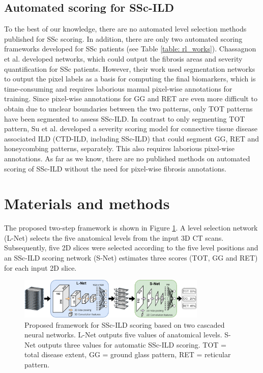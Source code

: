 \subsection{Automated scoring for SSc-ILD}
To the best of our knowledge, there are no automated level selection methods published for SSc scoring. In addition, there are only two automated scoring frameworks developed for SSc patients (see Table \ref{table: rl_works}). Chassagnon et al. \cite{Chassagnon2020} developed networks, which could output the fibrosis areas and severity quantification for SSc patients. However, their work used segmentation networks to output the pixel labels as a basis for computing the final biomarkers, which is time-consuming and requires laborious manual pixel-wise annotations for training. Since pixel-wise annotations for GG and RET are even more difficult to obtain due to unclear boundaries between the two patterns, only TOT patterns have been segmented to assess SSc-ILD. In contrast to only segmenting TOT pattern, Su et al. \cite{su2023computed} developed a severity scoring model for connective tissue disease associated ILD (CTD-ILD, including SSc-ILD) that could segment GG, RET and honeycombing patterns, separately. This also requires laborious pixel-wise annotations. As far as we know, there are no published methods on automated scoring of SSc-ILD without the need for pixel-wise fibrosis annotations.

\section{Materials and methods}
The proposed two-step framework is shown in Figure \ref{fig2}. A level selection network (L-Net) selects the five anatomical levels from the input 3D CT scans. Subsequently, five 2D slices were selected according to the five level positions and an SSc-ILD scoring network (S-Net) estimates three scores (TOT, GG and RET) for each input 2D slice.



\begin{figure}[tb]
    \centering
    \includegraphics[width=0.8\textwidth]{figure2.png}
    \caption{Proposed framework for SSc-ILD scoring based on two cascaded neural networks. L-Net outputs five values of anatomical levels. S-Net outputs three values for automatic SSc-ILD scoring. TOT = total disease extent, GG = ground glass pattern, RET = reticular pattern.}
    \label{fig2}
\end{figure}


